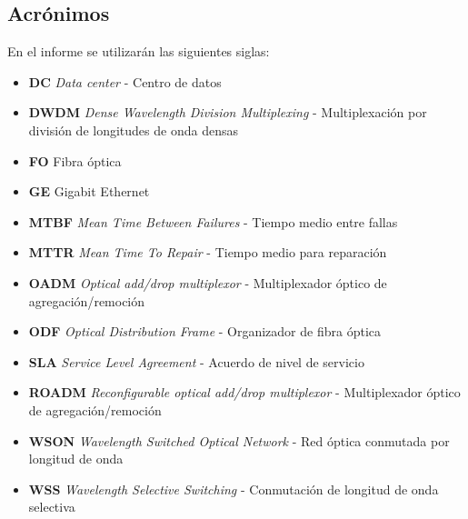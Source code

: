\subsection{Acrónimos}
\label{sec:acronimos}

En el informe se utilizarán las siguientes siglas:
\begin{itemize}
\item \textbf{DC} \emph{Data center} - Centro de datos
\item \textbf{DWDM} \emph{Dense Wavelength Division Multiplexing} - Multiplexación por división de longitudes de onda densas
\item \textbf{FO} Fibra óptica
\item \textbf{GE} Gigabit Ethernet
\item \textbf{MTBF} \emph{Mean Time Between Failures} - Tiempo medio entre fallas
\item \textbf{MTTR} \emph{Mean Time To Repair} - Tiempo medio para reparación
\item \textbf{OADM} \emph{Optical add/drop multiplexor} - Multiplexador óptico de agregación/remoción
\item \textbf{ODF} \emph{Optical Distribution Frame} - Organizador de fibra óptica
\item \textbf{SLA} \emph{Service Level Agreement} - Acuerdo de nivel de servicio
\item \textbf{ROADM} \emph{Reconfigurable optical add/drop multiplexor} - Multiplexador óptico de agregación/remoción
\item \textbf{WSON} \emph{Wavelength Switched Optical Network} - Red óptica conmutada por longitud de onda
\item \textbf{WSS} \emph{Wavelength Selective Switching} - Conmutación de longitud de onda selectiva
\end{itemize}